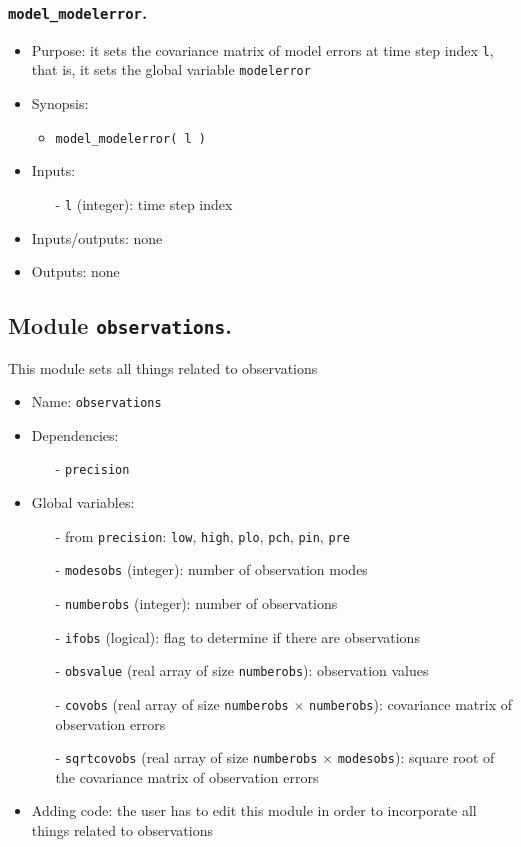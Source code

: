 \documentclass[12pt]{article}
\begin{document}
\subsubsection{{\tt model\_modelerror}.}
\begin{itemize}
\item Purpose: it sets the covariance matrix of model errors at time step index {\tt l}, that is, it sets the global variable {\tt modelerror}
\item Synopsis: 
\begin{itemize}
\item {\tt model\_modelerror( l )}
\end{itemize}
\item Inputs: 
\begin{itemize}
\item[-] {\tt l} (integer): time step index
\end{itemize}
\item Inputs/outputs: none
\item Outputs: none
\end{itemize} 

\subsection{Module {\tt observations}.}
This module sets all things related to observations
\begin{itemize}
\item Name: {\tt observations}
\item Dependencies: 
\begin{itemize}
\item[-] {\tt precision}
\end{itemize}
\item Global variables: 
\begin{itemize}
\item[-] from {\tt precision}: {\tt low}, {\tt high}, {\tt plo}, {\tt pch}, {\tt pin}, {\tt pre} 
\item[-] {\tt modesobs} (integer): number of observation modes
\item[-] {\tt numberobs} (integer): number of observations 
\item[-] {\tt ifobs} (logical): flag to determine if there are observations
\item[-] {\tt obsvalue} (real array of size {\tt numberobs}): observation values
\item[-] {\tt covobs} (real array of size {\tt numberobs} $\times$ {\tt numberobs}): covariance matrix of observation errors
\item[-] {\tt sqrtcovobs} (real array of size {\tt numberobs} $\times$ {\tt modesobs}): square root of the covariance matrix of observation errors
\end{itemize}
\item Adding code: the user has to edit this module in order to incorporate all things related to observations
\end{itemize}
\end{document}
